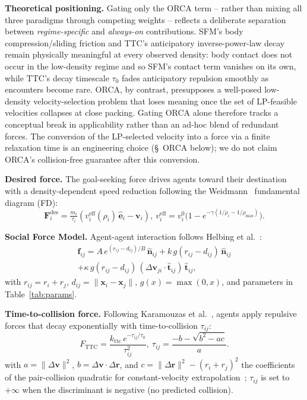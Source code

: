 \documentclass[a4paper,twoside]{article}
\begin{document}
\textbf{Theoretical positioning.}
Gating only the ORCA term -- rather than mixing all three paradigms through competing weights -- reflects a deliberate separation between \emph{regime-specific} and \emph{always-on} contributions. SFM's body compression/sliding friction and TTC's anticipatory inverse-power-law decay remain physically meaningful at every observed density: body contact does not occur in the low-density regime and so SFM's contact term vanishes on its own, while TTC's decay timescale $\tau_0$ fades anticipatory repulsion smoothly as encounters become rare. ORCA, by contrast, presupposes a well-posed low-density velocity-selection problem that loses meaning once the set of LP-feasible velocities collapses at close packing. Gating ORCA alone therefore tracks a conceptual break in applicability rather than an ad-hoc blend of redundant forces. The conversion of the LP-selected velocity into a force via a finite relaxation time is an engineering choice (\S~ORCA below); we do not claim ORCA's collision-free guarantee after this conversion.

\textbf{Desired force.}
The goal-seeking force drives agents toward their destination with a density-dependent speed reduction following the Weidmann~\cite{Weidmann93} fundamental diagram (FD):
\begin{equation}\label{eq:desired}
    \mathbf{F}_i^{\text{des}} = \tfrac{m_i}{\tau_i}\!\left(v_i^{\text{eff}}(\rho_i)\,\hat{\mathbf{e}}_i - \mathbf{v}_i\right),\ v_i^{\text{eff}} = v_i^0\bigl(1 - e^{-\gamma(1/\rho_i - 1/\rho_{\max})}\bigr).
\end{equation}

\textbf{Social Force Model.}
Agent-agent interaction follows Helbing et al.~\cite{Helbing00}:
\begin{multline}\label{eq:sfm}
    \mathbf{f}_{ij} = A\,e^{(r_{ij} - d_{ij})/B}\,\hat{\mathbf{n}}_{ij} + k\,g(r_{ij} - d_{ij})\,\hat{\mathbf{n}}_{ij} \\
    + \kappa\,g(r_{ij} - d_{ij})\,(\Delta\mathbf{v}_{ji}{\cdot}\hat{\mathbf{t}}_{ij})\,\hat{\mathbf{t}}_{ij},
\end{multline}
with $r_{ij}=r_i+r_j$, $d_{ij}=\|\mathbf{x}_i-\mathbf{x}_j\|$, $g(x)=\max(0,x)$, and parameters in Table~\ref{tab:params}.

\textbf{Time-to-collision force.}
Following Karamouzas et al.~\cite{Karamouzas14}, agents apply repulsive forces that decay exponentially with time-to-collision $\tau_{ij}$:
\begin{equation}\label{eq:ttc}
    F_{\mathrm{TTC}} = \frac{k_{\mathrm{ttc}}\,e^{-\tau_{ij}/\tau_0}}{\tau_{ij}^2},\ \tau_{ij} = \frac{-b - \sqrt{b^2-ac}}{a}.
\end{equation}
with $a=\|\Delta\mathbf{v}\|^2$, $b=\Delta\mathbf{v}\cdot\Delta\mathbf{r}$, and $c=\|\Delta\mathbf{r}\|^2-(r_i+r_j)^2$ the coefficients of the pair-collision quadratic for constant-velocity extrapolation~\cite{Karamouzas14}; $\tau_{ij}$ is set to $+\infty$ when the discriminant is negative (no predicted collision).
\end{document}
